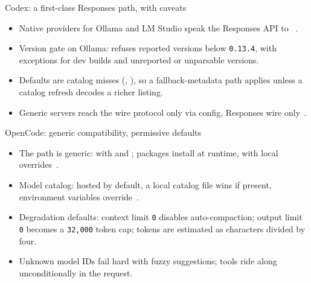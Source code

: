 \documentclass[aspectratio=169,11pt]{beamer}
\begin{document}
\begin{frame}{Codex: a first-class Responses path, with caveats}
  \begin{itemize}
    \item Native providers for Ollama and LM Studio speak the Responses
    API to ~\citep{codexRepo}.
    \item Version gate on Ollama: refuses reported versions below
    \texttt{0.13.4}, with exceptions for dev builds and unreported or
    unparsable versions.
    \item Defaults are catalog misses (,
    ), so a fallback-metadata path applies
    unless a catalog refresh decodes a richer listing.
    \item Generic servers reach the wire protocol only via
     config, Responses wire
    only~\citep{codexRepo}.
  \end{itemize}
\end{frame}

\begin{frame}{OpenCode: generic compatibility, permissive defaults}
  \begin{itemize}
    \item The path is generic:  with
     and ; packages install at runtime, with
     local overrides~\citep{opencodeRepo}.
    \item Model catalog: hosted  by default, a
    local catalog file wins if present, environment variables
    override~\citep{opencodeRepo}.
    \item Degradation defaults: context limit \texttt{0} disables
    auto-compaction; output limit \texttt{0} becomes a \texttt{32,000}
    token cap; tokens are estimated as characters divided by four.
    \item Unknown model IDs fail hard with fuzzy suggestions; tools ride
    along unconditionally in the request.
  \end{itemize}
\end{frame}
\end{document}
